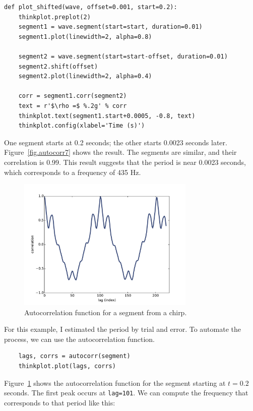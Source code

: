 \documentclass[12pt]{book}
\begin{document}
\begin{verbatim}
def plot_shifted(wave, offset=0.001, start=0.2):
    thinkplot.preplot(2)
    segment1 = wave.segment(start=start, duration=0.01)
    segment1.plot(linewidth=2, alpha=0.8)

    segment2 = wave.segment(start=start-offset, duration=0.01)
    segment2.shift(offset)
    segment2.plot(linewidth=2, alpha=0.4)

    corr = segment1.corr(segment2)
    text = r'$\rho =$ %.2g' % corr
    thinkplot.text(segment1.start+0.0005, -0.8, text)
    thinkplot.config(xlabel='Time (s)')
\end{verbatim} 

One segment starts at 0.2 seconds; the other starts 0.0023 seconds
later.  Figure~\ref{fig.autocorr7} shows the result.  The segments
are similar, and their correlation is 0.99.  This result suggests
that the period is near 0.0023 seconds, which corresponds to a frequency
of 435 Hz.

\begin{figure}
\centerline{\includegraphics[height=2.5in]{figs/autocorr8.pdf}}
\caption{Autocorrelation function for a segment from a chirp.}
\label{fig.autocorr8}
\end{figure}

For this example, I estimated the period by trial and error.  To automate
the process, we can use the autocorrelation function.

\begin{verbatim}
    lags, corrs = autocorr(segment)
    thinkplot.plot(lags, corrs)
\end{verbatim}

Figure~\ref{fig.autocorr8} shows the autocorrelation function for
the segment starting at $t=0.2$ seconds.  The first peak occurs at
{\tt lag=101}.  We can compute the frequency that corresponds
to that period like this:
\end{document}
